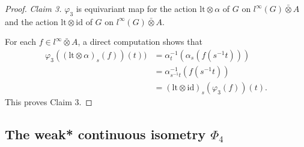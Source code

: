 \documentclass[reqno,11pt]{amsart}
\theoremstyle{plain}
\theoremstyle{definition}
\theoremstyle{remark}
\begin{document}
\begin{proof}
{\it Claim 3.} $\varphi_3$ is equivariant map for the action $\mathrm{lt}\otimes\alpha$ of $G$ on $l^\infty(G)\bar{\otimes}A$ and the action $\mathrm{lt}\otimes\mathrm{id}$ of $G$ on $l^\infty(G)\bar{\otimes}A$.

For each $f\in l^\infty\bar{\otimes}A$,
a direct computation shows that $$\begin{aligned} \varphi_{3}((\mathrm{lt}\otimes \alpha)_{s}(f))(t))&=
\alpha^{-1}_{t}(\alpha_{s}(f(s^{-1}t)))\\
&=\alpha^{-1}_{s^{-1}t}(f(s^{-1}t))\\
&=(\mathrm{lt}\otimes \mathrm{id})_{s}(\varphi_{3}(f))(t). \end{aligned}$$
This proves Claim 3.
\end{proof}





\subsection{The weak* continuous isometry $\Phi_4$}
\end{document}
